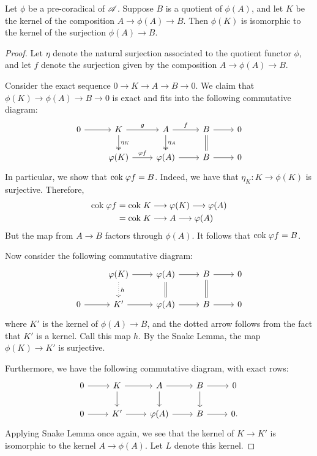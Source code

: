 \begin{prop}
Let $\phi$ be a pre-coradical of $\mathscr{A}$. Suppose $B$ is a 
quotient of $\phi(A)$, and let $K$ be the kernel of the 
composition $A \to \phi(A) \to B$. Then $\phi(K)$ is isomorphic 
to the kernel of the surjection $\phi(A) \to B$.
\end{prop}
\begin{proof}
Let $\eta$ denote the natural surjection associated to the 
quotient functor $\phi$, and let $f$ denote the surjection given 
by the composition $A \to \phi(A) \to B$.

Consider the exact sequence $0 \to K \to A \to B \to 0$. We claim
that $\phi(K) \to \phi(A) \to B \to 0$ is exact and fits into the 
following commutative diagram:
\[
\begin{tikzcd}
0 \arrow{r} &
K \arrow{r}{g} \arrow[twoheadrightarrow]{d}{\eta_K} &
A \arrow{r}{f} \arrow[twoheadrightarrow]{d}{\eta_A} &
B \arrow{r} \arrow[equal]{d} &
0 \\
& \phi(K) \arrow{r}{\phi f} &
\phi(A) \arrow{r} &
B \arrow{r} &
0
\end{tikzcd}
\]
In particular, we show that $\mathrm{cok}\; \varphi f = B$. Indeed, we have
that $\eta_K: K \to \phi(K)$ is surjective. Therefore,
\begin{align*}
\mathrm{cok}\; \varphi f  &= \mathrm{cok}\; K \longrightarrow \varphi(K) \longrightarrow \varphi(A) \\
             &= \mathrm{cok}\; K \longrightarrow A \longrightarrow \varphi(A)
\end{align*}
But the map from $A \to B$ factors through $\phi(A)$. It follows
that $\mathrm{cok}\; \varphi f = B$.

Now consider the following commutative diagram:
\[
\begin{tikzcd}
{}
&\phi(K) \arrow{r} \arrow[dotted]{d}{h}
&\phi(A) \arrow{r} \arrow[equals]{d}
&B \arrow{r} \arrow[equals]{d}
&0\\
0 \arrow{r}
& K' \arrow{r}
&\phi(A) \arrow{r}
&B \arrow{r}
&0
\end{tikzcd}
\]
where $K'$ is the kernel of $\phi(A) \to B$, and the dotted arrow
follows from the fact that $K'$ is a kernel. Call this map $h$. 
By the Snake Lemma, the map $\phi(K) \to K'$ is surjective.

Furthermore, we have the following commutative diagram, with
exact rows:
\[
\begin{tikzcd}
0 \arrow{r} &
K \arrow{r} \arrow{d} &
A \arrow{r} \arrow{d} &
B \arrow{r} \arrow{d} &
0 \\
0 \arrow{r} &
K' \arrow{r} &
\phi(A) \arrow{r} &
B \arrow{r} &
0.
\end{tikzcd}
\]
Applying Snake Lemma once again, we see that the kernel of $K \to 
K'$ is isomorphic to the kernel $A \to \phi(A)$. Let $L$ denote
this kernel.


\end{proof}
